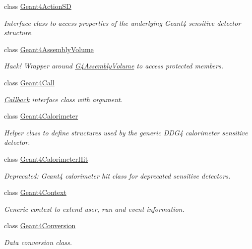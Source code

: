 \begin{DoxyCompactItemize}
class \hyperlink{class_d_d4hep_1_1_simulation_1_1_geant4_action_s_d}{Geant4\+Action\+SD}
\begin{DoxyCompactList}\small\item\em Interface class to access properties of the underlying Geant4 sensitive detector structure. \end{DoxyCompactList}\item 
class \hyperlink{class_d_d4hep_1_1_simulation_1_1_geant4_assembly_volume}{Geant4\+Assembly\+Volume}
\begin{DoxyCompactList}\small\item\em Hack! Wrapper around \hyperlink{class_g4_assembly_volume}{G4\+Assembly\+Volume} to access protected members. \end{DoxyCompactList}\item 
class \hyperlink{class_d_d4hep_1_1_simulation_1_1_geant4_call}{Geant4\+Call}
\begin{DoxyCompactList}\small\item\em \hyperlink{class_d_d4hep_1_1_callback}{Callback} interface class with argument. \end{DoxyCompactList}\item 
class \hyperlink{class_d_d4hep_1_1_simulation_1_1_geant4_calorimeter}{Geant4\+Calorimeter}
\begin{DoxyCompactList}\small\item\em Helper class to define structures used by the generic D\+D\+G4 calorimeter sensitive detector. \end{DoxyCompactList}\item 
class \hyperlink{class_d_d4hep_1_1_simulation_1_1_geant4_calorimeter_hit}{Geant4\+Calorimeter\+Hit}
\begin{DoxyCompactList}\small\item\em Deprecated\+: Geant4 calorimeter hit class for deprecated sensitive detectors. \end{DoxyCompactList}\item 
class \hyperlink{class_d_d4hep_1_1_simulation_1_1_geant4_context}{Geant4\+Context}
\begin{DoxyCompactList}\small\item\em Generic context to extend user, run and event information. \end{DoxyCompactList}\item 
class \hyperlink{class_d_d4hep_1_1_simulation_1_1_geant4_conversion}{Geant4\+Conversion}
\begin{DoxyCompactList}\small\item\em Data conversion class. \end{DoxyCompactList}\item 

\end{DoxyCompactItemize}
